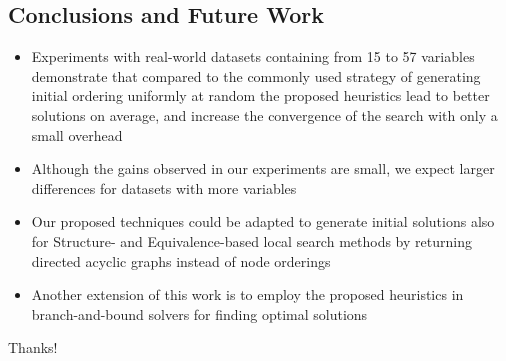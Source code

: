 \subsection{Conclusions and Future Work}
	\begin{frame}
		\begin{itemize}
			\item Experiments with real-world datasets containing from 15 to 57 variables demonstrate that compared to the commonly used strategy of generating initial ordering uniformly at random the proposed heuristics lead to better solutions on average, and increase the convergence of the search with only a small overhead
			\item Although the gains observed in our experiments are small, we expect larger differences for datasets with more variables
			\item Our proposed techniques could be adapted to generate initial solutions also for Structure- and Equivalence-based local search methods by returning directed acyclic graphs instead of node orderings
			\item Another extension of this work is to employ the proposed heuristics in branch-and-bound solvers for finding optimal solutions
		\end{itemize}
	\end{frame}

\begin{frame}
	\centering
	\LARGE{Thanks!}
\end{frame}